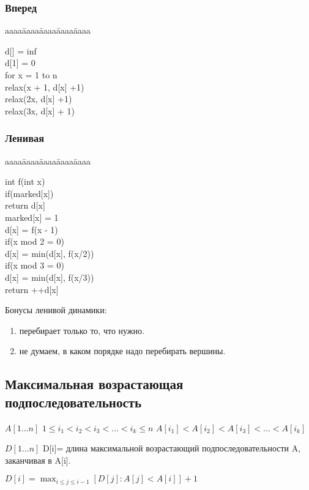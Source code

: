 \documentclass[12pt]{article}
\def\t{\texttt}
\newenvironment{MyTabbing}{
\t\bgroup
\begin{tabbing}
aaaa\=aaaa\=aaaa\=aaaa\=aaaa\kill
}{
\end{tabbing}
\t\egroup
}
\begin{document}
\subsubsection{Вперед}

\begin{MyTabbing}
d[] = inf \\
d[1] = 0\\
for x = 1 to n\\
\>relax(x + 1, d[x]  +1)\\
\>relax(2x, d[x]  +1)\\
\>relax(3x, d[x] + 1)\\
\end{MyTabbing}

\subsubsection{Ленивая}

\begin{MyTabbing}
int f(int x)\\
\>if(marked[x])\\
\>\>return d[x]\\
\>marked[x] = 1\\
\>d[x] = f(x - 1)\\
\>if(x mod 2 = 0)\\
\>\>d[x] = min(d[x], f(x/2))\\
\>if(x mod 3 = 0)\\
\>\>d[x] = min(d[x], f(x/3))\\
\>return ++d[x]
\end{MyTabbing}

Бонусы ленивой динамики:
\begin{enumerate}
\item перебирает только то, что нужно.
\item не думаем, в каком порядке надо перебирать вершины.
\end{enumerate}
\subsection{Максимальная возрастающая подпоследовательность}

$A[1\ldots n]$  $1 \le i_1 < i_2 < i_3 < \ldots < i_k \le n$   $A[i_1] < A[i_2] < A[i_3] < \ldots < A[i_k]$   


$D[1 \ldots n]$
D[i]= длина максимальной возрастающий подпоследовательности A, заканчивая в A[i].

$D[i] =\max_{i \le j \le i - 1} [D[j]: A[j] < A[i]] + 1$
\end{document}
